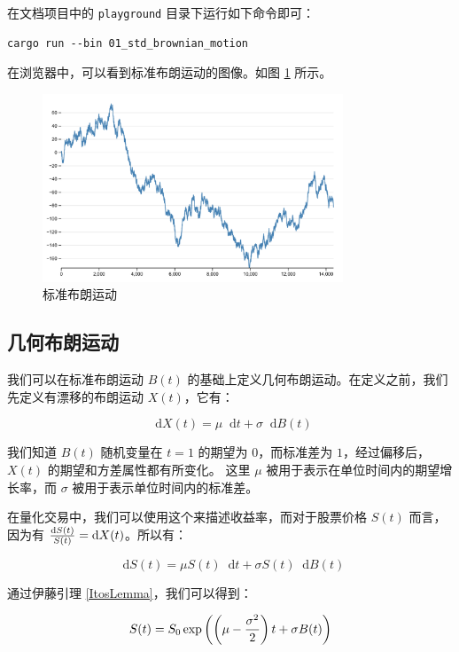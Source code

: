 \documentclass[utf8,a4paper,nofonts]{ctexbook}
\def\dif{\mathop{}\!\mathrm{d}}
\begin{document}
在文档项目中的 \verb|playground| 目录下运行如下命令即可：

\begin{lstlisting}
cargo run --bin 01_std_brownian_motion
\end{lstlisting}

在浏览器中，可以看到标准布朗运动的图像。如图 \ref{fig:stdBrownianMotion} 所示。

\begin{figure}[h]
    \centering
    \includegraphics[width=0.8\textwidth]{src/static/00_std_brownian_motion.png}
    \caption{标准布朗运动}
    \label{fig:stdBrownianMotion}
\end{figure}

\subsection[几何布朗运动]{几何布朗运动\protect\footnotemark}

我们可以在标准布朗运动 $B(t)$ 的基础上定义几何布朗运动。在定义之前，我们先定义有漂移的布朗运动 $X(t)$，它有：

$$
\dif{X(t)} = \mu \dif{t} + \sigma \dif{B(t)}
$$

我们知道 $B(t)$ 随机变量在 $t = 1$ 的期望为 $0$，而标准差为 $1$，经过偏移后，$X(t)$ 的期望和方差属性都有所变化。
这里 $\mu$ 被用于表示在单位时间内的期望增长率，而 $\sigma$ 被用于表示单位时间内的标准差。

在量化交易中，我们可以使用这个来描述收益率，而对于股票价格 $S(t)$ 而言，因为有 ${\dif{S(t)} \over S(t)} = \dif{X(t)}$。所以有：

$$
\dif{S(t)} = \mu S(t) \dif{t} + \sigma S(t) \dif{B(t)}
$$

通过伊藤引理 \ref{ItosLemma}，我们可以得到：

$$
S(t) = S_0 \exp\left(\left(\mu - {\sigma^2 \over 2}\right)t + \sigma B(t)\right)
$$
\end{document}
